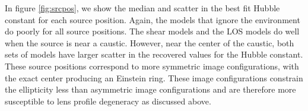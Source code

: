 In figure \ref{fig:srcpos}, we show the median and scatter in the best fit Hubble constant for each source position. Again, the models that ignore the environment do poorly for all source positions. The shear models and the LOS models do well when the source is near a caustic. However, near the center of the caustic, both sets of models have larger scatter in the recovered values for the Hubble constant. These source positions correspond to more symmetric image configurations, with the exact center producing an Einstein ring. These image configurations constrain the ellipticity less than asymmetric image configurations and are therefore more susceptible to lens profile degeneracy as discussed above.